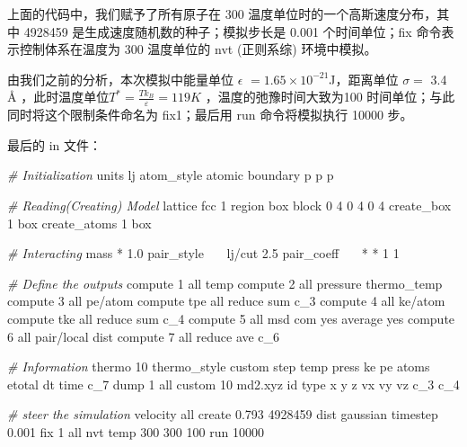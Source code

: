 \documentclass[
]{article}
\newenvironment{Shaded}{}{}
\newcommand{\BuiltInTok}[1]{#1}
\newcommand{\CommentTok}[1]{\textcolor[rgb]{0.38,0.63,0.69}{\textit{#1}}}
\newcommand{\DecValTok}[1]{\textcolor[rgb]{0.25,0.63,0.44}{#1}}
\newcommand{\FloatTok}[1]{\textcolor[rgb]{0.25,0.63,0.44}{#1}}
\newcommand{\NormalTok}[1]{#1}
\newcommand{\OperatorTok}[1]{\textcolor[rgb]{0.40,0.40,0.40}{#1}}
\begin{document}
上面的代码中，我们赋予了所有原子在 300
温度单位时的一个高斯速度分布，其中 4928459
是生成速度随机数的种子；模拟步长是 0.001 个时间单位；fix
命令表示控制体系在温度为 300 温度单位的 nvt (正则系综) 环境中模拟。

由我们之前的分析，本次模拟中能量单位 \(\epsilon\)
\(=1.65\times10^{-21}\)J，距离单位 \(\sigma =\) 3.4 Å
，此时温度单位\(T^*=\frac {Tk_B}{\varepsilon}=119K\)
，温度的弛豫时间大致为100 时间单位；与此同时将这个限制条件命名为
fix1；最后用 run 命令将模拟执行 10000 步。

最后的 in 文件：

\begin{Shaded}
\begin{Highlighting}[]
\CommentTok{\# Initialization}
\NormalTok{units					 lj}
\NormalTok{atom\_style				 atomic}
\NormalTok{boundary				 p p p}

\CommentTok{\# Reading(Creating) Model}
\NormalTok{lattice					fcc }\DecValTok{1}
\NormalTok{region					box block }\DecValTok{0} \DecValTok{4} \DecValTok{0} \DecValTok{4} \DecValTok{0} \DecValTok{4}
\NormalTok{create\_box  			 }\DecValTok{1}\NormalTok{ box}
\NormalTok{create\_atoms			 }\DecValTok{1}\NormalTok{ box}

\CommentTok{\# Interacting}
\NormalTok{mass   	 			     }\OperatorTok{*} \FloatTok{1.0}
\NormalTok{pair\_style    			 lj}\OperatorTok{/}\NormalTok{cut }\FloatTok{2.5}
\NormalTok{pair\_coeff    			 }\OperatorTok{*} \OperatorTok{*} \DecValTok{1} \DecValTok{1}

\CommentTok{\# Define the outputs}
\NormalTok{compute				}\DecValTok{1} \BuiltInTok{all}\NormalTok{ temp}
\NormalTok{compute				}\DecValTok{2} \BuiltInTok{all}\NormalTok{ pressure thermo\_temp}
\NormalTok{compute				}\DecValTok{3} \BuiltInTok{all}\NormalTok{ pe}\OperatorTok{/}\NormalTok{atom}
\NormalTok{compute				tpe }\BuiltInTok{all} \BuiltInTok{reduce} \BuiltInTok{sum}\NormalTok{ c\_3}
\NormalTok{compute				}\DecValTok{4} \BuiltInTok{all}\NormalTok{ ke}\OperatorTok{/}\NormalTok{atom}
\NormalTok{compute				tke }\BuiltInTok{all} \BuiltInTok{reduce} \BuiltInTok{sum}\NormalTok{ c\_4}
\NormalTok{compute				}\DecValTok{5} \BuiltInTok{all}\NormalTok{ msd com yes average yes}
\NormalTok{compute				}\DecValTok{6} \BuiltInTok{all}\NormalTok{ pair}\OperatorTok{/}\NormalTok{local dist}
\NormalTok{compute				}\DecValTok{7} \BuiltInTok{all} \BuiltInTok{reduce}\NormalTok{ ave c\_6}


\CommentTok{\# Information}
\NormalTok{thermo }\DecValTok{10}
\NormalTok{thermo\_style custom step temp press ke pe atoms etotal dt time c\_7}
\NormalTok{dump }\DecValTok{1} \BuiltInTok{all}\NormalTok{ custom }\DecValTok{10}\NormalTok{ md2.xyz }\BuiltInTok{id} \BuiltInTok{type}\NormalTok{ x y z vx vy vz c\_3 c\_4}

\CommentTok{\# steer the simulation}
\NormalTok{velocity				}\BuiltInTok{all}\NormalTok{ create }\FloatTok{0.793} \DecValTok{4928459}\NormalTok{ dist gaussian}
\NormalTok{timestep				}\FloatTok{0.001}
\NormalTok{fix     				}\DecValTok{1} \BuiltInTok{all}\NormalTok{ nvt temp }\DecValTok{300} \DecValTok{300} \DecValTok{100}
\NormalTok{run     				}\DecValTok{10000}
\end{Highlighting}
\end{Shaded}
\end{document}

